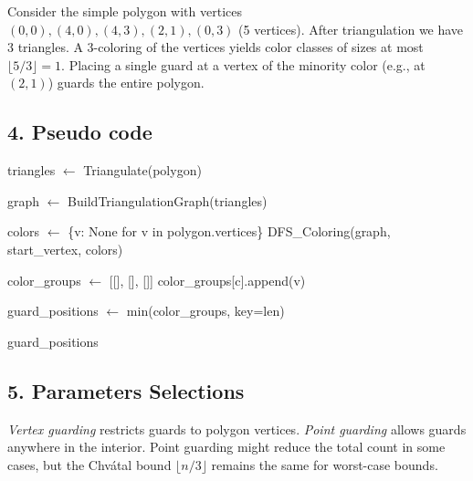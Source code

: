 \begin{example}
\label{ex:ag_6}
Consider the simple polygon with vertices $(0,0), (4,0), (4,3), (2,1), (0,3)$ (5 vertices). After triangulation we have 3 triangles. A 3-coloring of the vertices yields color classes of sizes at most $\lfloor 5/3 \rfloor = 1$. Placing a single guard at a vertex of the minority color (e.g., at $(2,1)$) guards the entire polygon.
\end{example}



\subsection{4. Pseudo code}
\begin{algorithm}
\begin{algorithmic}[1]
\label{alg:place_guards}
    \State triangles $\gets$ Triangulate(polygon)
    
    \State graph $\gets$ BuildTriangulationGraph(triangles)
    
    \State colors $\gets$ \{v: None for v in polygon.vertices\}
    \State DFS\_Coloring(graph, start\_vertex, colors)
    
    \State color\_groups $\gets$ [[], [], []]
        \State color\_groups[c].append(v)
    \EndFor
        
    \State guard\_positions $\gets$ min(color\_groups, key=len)
    
    \State \Return guard\_positions
\EndFunction
\end{algorithmic}
\end{algorithm}

\subsection{5. Parameters Selections}
\begin{definition}
\label{def:ag_vertex_guarding}
\emph{Vertex guarding} restricts guards to polygon vertices. \emph{Point guarding} allows guards anywhere in the interior. Point guarding might reduce the total count in some cases, but the Chv\'{a}tal bound $\lfloor n/3 \rfloor$ remains the same for worst-case bounds.
\end{definition}

